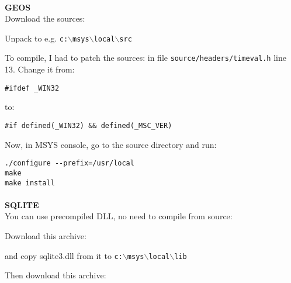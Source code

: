 \paragraph{}\textbf{GEOS}\\

Download the sources:

	\begin{quotation}
	\end{quotation}

Unpack to e.g. \texttt{c:$\backslash$msys$\backslash$local$\backslash$src}

To compile, I had to patch the sources: in file \texttt{source/headers/timeval.h} line 13.
Change it from:

\begin{verbatim}
#ifdef _WIN32
\end{verbatim}
to:

\begin{verbatim}
#if defined(_WIN32) && defined(_MSC_VER)
\end{verbatim}

Now, in MSYS console, go to the source directory and run:

\begin{verbatim}
./configure --prefix=/usr/local
make
make install
\end{verbatim}

\paragraph{}\textbf{SQLITE}\\

You can use precompiled DLL, no need to compile from source:

Download this archive:

	\begin{quotation}
	\end{quotation}

and copy sqlite3.dll from it to \texttt{c:$\backslash$msys$\backslash$local$\backslash$lib}

Then download this archive:

	\begin{quotation}
	\end{quotation}


